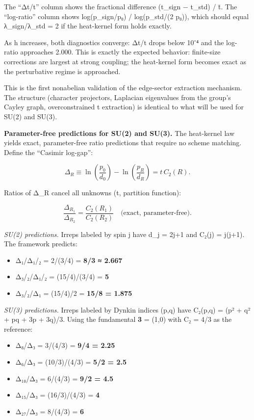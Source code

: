\documentclass[
]{article}
\providecommand{\tightlist}{%
  \setlength{\itemsep}{0pt}\setlength{\parskip}{0pt}}
\begin{document}
The ``Δt/t'' column shows the fractional difference (t\_sign − t\_std) /
t̄. The ``log-ratio'' column shows log(p\_sign/p₀) / log(p\_std/(2 p₀)),
which should equal λ\_sign/λ\_std = 2 if the heat-kernel form holds
exactly.

As h increases, both diagnostics converge: Δt/t drops below 10⁻⁴ and the
log-ratio approaches 2.000. This is exactly the expected behavior:
finite-size corrections are largest at strong coupling; the heat-kernel
form becomes exact as the perturbative regime is approached.

This is the first nonabelian validation of the edge-sector extraction
mechanism. The structure (character projectors, Laplacian eigenvalues
from the group's Cayley graph, overconstrained t extraction) is
identical to what will be used for SU(2) and SU(3).

\textbf{Parameter-free predictions for SU(2) and SU(3).} The heat-kernel
law yields exact, parameter-free ratio predictions that require no
scheme matching. Define the ``Casimir log-gap'':

\[
\Delta_R \equiv \ln\left(\frac{p_0}{d_0}\right) - \ln\left(\frac{p_R}{d_R}\right)
= t \, C_2(R).
\]

Ratios of Δ\_R cancel all unknowns (t, partition function):

\[
\frac{\Delta_{R_1}}{\Delta_{R_2}} = \frac{C_2(R_1)}{C_2(R_2)}
\quad \text{(exact, parameter-free).}
\]

\emph{SU(2) predictions.} Irreps labeled by spin j have d\_j = 2j+1 and
C₂(j) = j(j+1). The framework predicts:

\begin{itemize}
\tightlist
\item
  Δ₁/Δ₁/₂ = 2/(3/4) = \textbf{8/3 ≈ 2.667}
\item
  Δ₃/₂/Δ₁/₂ = (15/4)/(3/4) = \textbf{5}
\item
  Δ₃/₂/Δ₁ = (15/4)/2 = \textbf{15/8 = 1.875}
\end{itemize}

\emph{SU(3) predictions.} Irreps labeled by Dynkin indices (p,q) have
C₂(p,q) = (p² + q² + pq + 3p + 3q)/3. Using the fundamental \textbf{3} =
(1,0) with C₂ = 4/3 as the reference:

\begin{itemize}
\tightlist
\item
  Δ₈/Δ₃ = 3/(4/3) = \textbf{9/4 = 2.25}
\item
  Δ₆/Δ₃ = (10/3)/(4/3) = \textbf{5/2 = 2.5}
\item
  Δ₁₀/Δ₃ = 6/(4/3) = \textbf{9/2 = 4.5}
\item
  Δ₁₅/Δ₃ = (16/3)/(4/3) = \textbf{4}
\item
  Δ₂₇/Δ₃ = 8/(4/3) = \textbf{6}
\end{itemize}
\end{document}
